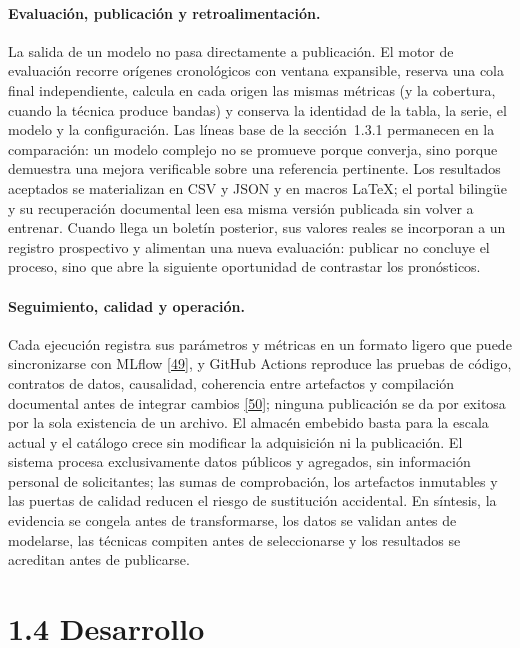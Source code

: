 \documentclass[12pt,letterpaper]{report}
\newcommand{\cita}[1]{\hyperref[bib:#1]{[#1]}}
\begin{document}
\paragraph{Evaluación, publicación y retroalimentación.} La salida de un modelo no pasa
directamente a publicación. El motor de evaluación recorre orígenes cronológicos con ventana
expansible, reserva una cola final independiente, calcula en cada origen las mismas métricas (y
la cobertura, cuando la técnica produce bandas) y conserva la identidad de la tabla, la serie,
el modelo y la configuración. Las líneas base de la sección~1.3.1 permanecen en la comparación:
un modelo complejo no se promueve porque converja, sino porque demuestra una mejora verificable
sobre una referencia pertinente. Los resultados aceptados se materializan en CSV y JSON y en
macros \LaTeX{}; el portal bilingüe y su recuperación documental leen esa misma versión
publicada sin volver a entrenar. Cuando llega un boletín posterior, sus valores reales se
incorporan a un registro prospectivo y alimentan una nueva evaluación: publicar no concluye el
proceso, sino que abre la siguiente oportunidad de contrastar los pronósticos.

\paragraph{Seguimiento, calidad y operación.} Cada ejecución registra sus parámetros y métricas
en un formato ligero que puede sincronizarse con MLflow \cita{49}, y GitHub Actions reproduce las
pruebas de código, contratos de datos, causalidad, coherencia entre artefactos y compilación
documental antes de integrar cambios \cita{50}; ninguna publicación se da por exitosa por la sola
existencia de un archivo. El almacén embebido basta para la escala actual y el catálogo crece sin
modificar la adquisición ni la publicación. El sistema procesa exclusivamente datos públicos y
agregados, sin información personal de solicitantes; las sumas de comprobación, los artefactos
inmutables y las puertas de calidad reducen el riesgo de sustitución accidental. En síntesis, la
evidencia se congela antes de transformarse, los datos se validan antes de modelarse, las
técnicas compiten antes de seleccionarse y los resultados se acreditan antes de publicarse.

\section{1.4 Desarrollo}
\end{document}
